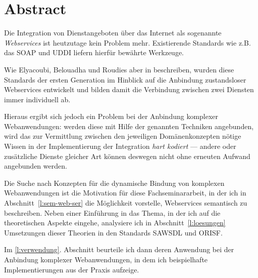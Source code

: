 \section*{Abstract}

Die Integration von Dienstangeboten über das Internet als sogenannte \emph{Webservices} ist heutzutage kein Problem mehr. Existierende Standards wie z.B. das \ac{SOAP} und \ac{UDDI} liefern hierfür bewährte Werkzeuge.

Wie Elyacoubi, Belouadha und Roudies aber in \cite{ei-sawsdl} beschreiben, wurden diese Standards der ersten Generation im Hinblick auf die Anbindung zustandsloser Webservices entwickelt und bilden damit die Verbindung zwischen zwei Diensten immer individuell ab.

Hieraus ergibt sich jedoch ein Problem bei der Anbindung komplexer Webanwendungen: werden diese mit Hilfe der genannten Techniken angebunden, wird das zur Vermittlung zwischen den jeweiligen Domänenkonzepten nötige Wissen in der Implementierung der Integration \emph{hart kodiert} --- andere oder zusätzliche Dienste gleicher Art können deswegen nicht ohne erneuten Aufwand angebunden werden.

Die Suche nach Konzepten für die dynamische Bindung von komplexen Webanwendungen ist die Motivation für diese Fachseminararbeit, in der ich in Abschnitt~\ref{l:sem-web-ser} die Möglichkeit vorstelle, Webservices semantisch zu beschreiben. Neben einer Einführung in das Thema, in der ich auf die theoretischen Aspekte eingehe, analysiere ich in Abschnitt~\ref{l:loesungen} Umsetzungen dieser Theorien in den Standards \ac{SAWSDL} und \ac{ORISF}.

Im \ref{l:verwendung}. Abschnitt beurteile ich dann deren Anwendung bei der Anbindung 
komplexer Webanwendungen, in dem ich beispielhafte Implementierungen aus der Praxis aufzeige.

